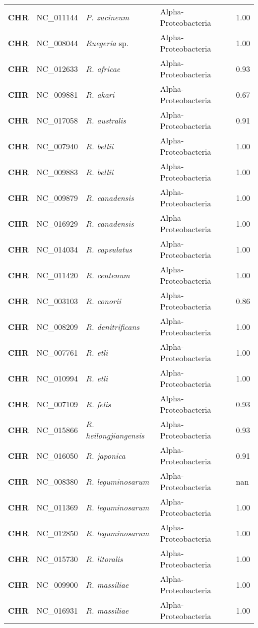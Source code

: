 \begin{adjustwidth}{-3cm}{2cm}
{\begin{supertabular}{>{\bfseries}l|p{0.1\textwidth}p{0.14\textwidth}l|l}
CHR & NC\_011144 & \textit{P. zucineum} & Alpha-Proteobacteria & 1.00\\
CHR & NC\_008044 & \textit{Ruegeria} sp. & Alpha-Proteobacteria & 1.00\\
CHR & NC\_012633 & \textit{R. africae} & Alpha-Proteobacteria & 0.93\\
CHR & NC\_009881 & \textit{R. akari} & Alpha-Proteobacteria & 0.67\\
CHR & NC\_017058 & \textit{R. australis} & Alpha-Proteobacteria & 0.91\\
CHR & NC\_007940 & \textit{R. bellii} & Alpha-Proteobacteria & 1.00\\
CHR & NC\_009883 & \textit{R. bellii} & Alpha-Proteobacteria & 1.00\\
CHR & NC\_009879 & \textit{R. canadensis} & Alpha-Proteobacteria & 1.00\\
CHR & NC\_016929 & \textit{R. canadensis} & Alpha-Proteobacteria & 1.00\\
CHR & NC\_014034 & \textit{R. capsulatus} & Alpha-Proteobacteria & 1.00\\
CHR & NC\_011420 & \textit{R. centenum} & Alpha-Proteobacteria & 1.00\\
CHR & NC\_003103 & \textit{R. conorii} & Alpha-Proteobacteria & 0.86\\
CHR & NC\_008209 & \textit{R. denitrificans} & Alpha-Proteobacteria & 1.00\\
CHR & NC\_007761 & \textit{R. etli} & Alpha-Proteobacteria & 1.00\\
CHR & NC\_010994 & \textit{R. etli} & Alpha-Proteobacteria & 1.00\\
CHR & NC\_007109 & \textit{R. felis} & Alpha-Proteobacteria & 0.93\\
CHR & NC\_015866 & \textit{R. heilongjiangensis} & Alpha-Proteobacteria & 0.93\\
CHR & NC\_016050 & \textit{R. japonica} & Alpha-Proteobacteria & 0.91\\
CHR & NC\_008380 & \textit{R. leguminosarum} & Alpha-Proteobacteria & nan\\
CHR & NC\_011369 & \textit{R. leguminosarum} & Alpha-Proteobacteria & 1.00\\
CHR & NC\_012850 & \textit{R. leguminosarum} & Alpha-Proteobacteria & 1.00\\
CHR & NC\_015730 & \textit{R. litoralis} & Alpha-Proteobacteria & 1.00\\
CHR & NC\_009900 & \textit{R. massiliae} & Alpha-Proteobacteria & 1.00\\
CHR & NC\_016931 & \textit{R. massiliae} & Alpha-Proteobacteria & 1.00\\

\end{supertabular}}
\end{adjustwidth}
